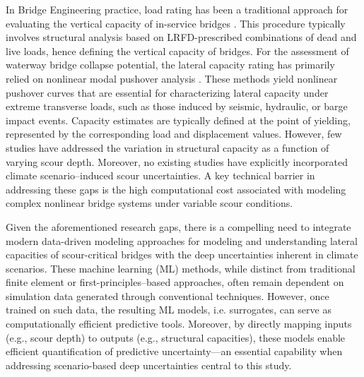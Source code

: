 \documentclass[authoryear,preprint,review,12pt]{elsarticle}
\begin{document}
In Bridge Engineering practice, load rating has been a traditional approach for evaluating the vertical capacity of in-service bridges \citep{Cai2003,Scott2008,Gokce2011}. This procedure typically involves structural analysis based on LRFD-prescribed combinations of dead and live loads, hence defining the vertical capacity of bridges. For the assessment of waterway bridge collapse potential, the lateral capacity rating has primarily relied on nonlinear modal pushover analysis \citep{Alipour2013,Bignell2005}. These methods yield nonlinear pushover curves that are essential for characterizing lateral capacity under extreme transverse loads, such as those induced by seismic, hydraulic, or barge impact events. Capacity estimates are typically defined at the point of yielding, represented by the corresponding load and displacement values. However, few studies have addressed the variation in structural capacity as a function of varying scour depth. Moreover, no existing studies have explicitly incorporated climate scenario–induced scour uncertainties. A key technical barrier in addressing these gaps is the high computational cost associated with modeling complex nonlinear bridge systems under variable scour conditions.


Given the aforementioned research gaps, there is a compelling need to integrate modern data-driven modeling approaches for modeling and understanding lateral capacities of scour-critical bridges with the deep uncertainties inherent in climate scenarios. These machine learning (ML) methods, while distinct from traditional finite element or first-principles–based approaches, often remain dependent on simulation data generated through conventional techniques. However, once trained on such data, the resulting ML models, i.e. surrogates, can serve as computationally efficient predictive tools. Moreover, by directly mapping inputs (e.g., scour depth) to outputs (e.g., structural capacities), these models enable efficient quantification of predictive uncertainty—an essential capability when addressing scenario-based deep uncertainties central to this study.
\end{document}
